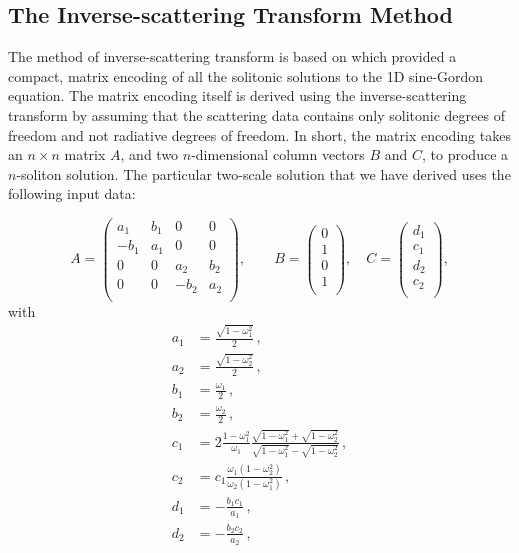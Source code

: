 \documentclass[11pt]{book}
\begin{document}
\subsection{The Inverse-scattering Transform Method}
The method of inverse-scattering transform is based on \cite{:/content/aip/journal/jmp/51/12/10.1063/1.3520596} which provided a compact, matrix encoding of all the solitonic solutions to the 1D sine-Gordon equation. The matrix encoding itself is derived using the inverse-scattering transform by assuming that the scattering data contains only solitonic degrees of freedom and not radiative degrees of freedom. In short, the matrix encoding takes an $n\times n$ matrix $A$, and two $n$-dimensional column vectors $B$ and $C$, to produce a $n$-soliton solution. The particular two-scale solution that we have derived uses the following input data:

\begin{equation}
A=\left(
\begin{array}{cccc}
 a_1 & b_1 & 0 & 0 \\
 -b_1 & a_1 & 0 & 0 \\
 0 & 0 & a_2 & b_2 \\
 0 & 0 & -b_2 & a_2 \\
\end{array}
\right),
\qquad B=\left(\begin{array}{c}
 0 \\
 1 \\
 0 \\
 1 \\
\end{array}\right),
\quad C=\left(\begin{array}{c}
 d_1 \\
 c_1 \\
 d_2 \\
 c_2 \\
\end{array}\right),
\end{equation}
with
\begin{subequations}\label{ivtparams}
  \begin{align}
    a_1 &=\frac{\sqrt{1-\omega_1^2}}{2}\,,\\
    a_2 &=\frac{\sqrt{1-\omega_2^2}}{2}\,,\\
    b_1 &=\frac{\omega_1}{2}\,,\\
    b_2 &=\frac{\omega_2}{2}\,,\\
    c_1 &= 2\frac{1-\omega_1^2}{\omega_1}
    \frac{\sqrt{1-\omega_1^2}+\sqrt{1-\omega_2^2}}{\sqrt{1-\omega_1^2}-\sqrt{1-\omega_2^2}}\,,\\
    c_2 &= c_1 \frac{\omega_1(1-\omega_2^2)}{\omega_2(1-\omega_1^2)}\,,\\
    d_1 &=-\frac{b_1 c_1}{a_1}\,,\\
    d_2 &=-\frac{b_2 c_2}{a_2}\,,
  \end{align}
\end{subequations}
\end{document}
